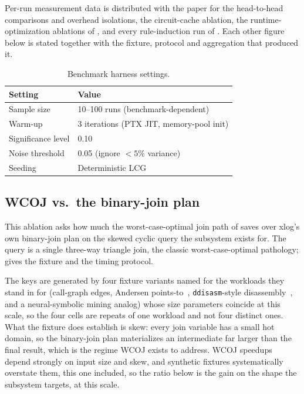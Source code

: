 Per-run measurement data is distributed with the paper for the head-to-head comparisons and overhead isolations, the circuit-cache ablation, the runtime-optimization ablations of , and every rule-induction run of . Each other figure below is stated together with the fixture, protocol and aggregation that produced it.

\begin{table}[htbp]
  \centering
  \caption{Benchmark harness settings.}
  \label{tab:stat-protocol}
  \small
  \begin{tabularx}{\linewidth}{@{}lL@{}}
    \toprule
    \textbf{Setting} & \textbf{Value} \\
    \midrule
    Sample size       & 10--100 runs (benchmark-dependent) \\
    Warm-up           & 3 iterations (PTX JIT, memory-pool init) \\
    Significance level & 0.10 \\
    Noise threshold   & 0.05 (ignore ${<}5\%$ variance) \\
    Seeding           & Deterministic LCG \\
    \bottomrule
  \end{tabularx}
\end{table}

\subsection{WCOJ vs.\ the binary-join plan}\label{sec:wcoj-eval}

This ablation asks how much the worst-case-optimal join path of  saves over xlog's own binary-join plan on the skewed cyclic query the subsystem exists for. The query is a single three-way triangle join, the classic worst-case-optimal pathology;  gives the fixture and the timing protocol.

The keys are generated by four fixture variants named for the workloads they stand in for (call-graph edges, Andersen points-to~\cite{andersen1994}, \texttt{ddisasm}-style disassembly~\cite{ddisasm}, and a neural-symbolic mining analog) whose size parameters coincide at this scale, so the four cells are repeats of one workload and not four distinct ones. What the fixture does establish is skew: every join variable has a small hot domain, so the binary-join plan materializes an intermediate far larger than the final result, which is the regime WCOJ exists to address. WCOJ speedups depend strongly on input size and skew, and synthetic fixtures systematically overstate them, this one included, so the ratio below is the gain on the shape the subsystem targets, at this scale.


